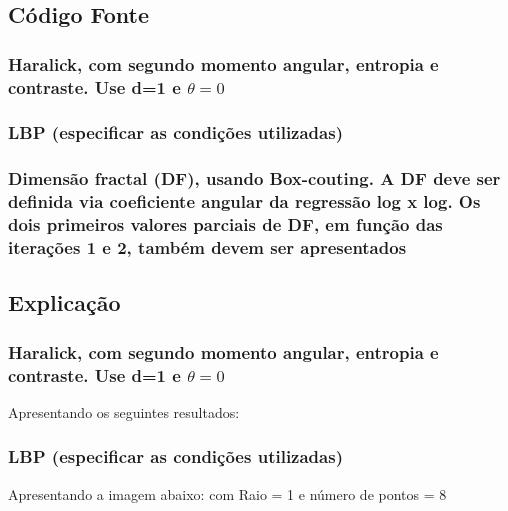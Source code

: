 \documentclass[10pt,a4paper]{article}
\begin{document}
\subsection{Código Fonte}

\subsubsection{Haralick, com segundo momento angular, entropia e contraste. Use d=1 e $\theta=0$}



\subsubsection{LBP (especificar as condições utilizadas)}



\subsubsection{Dimensão fractal (DF), usando Box-couting. A DF deve ser definida via coeficiente angular da regressão log x log. Os dois primeiros valores parciais de DF, em função das iterações 1 e 2, também devem ser apresentados}



\subsection{Explicação}

\subsubsection{Haralick, com segundo momento angular, entropia e contraste. Use d=1 e  $\theta=0$}

\begin{flushleft}
Apresentando os seguintes resultados:
\end{flushleft}



\subsubsection{LBP (especificar as condições utilizadas)}

\begin{flushleft}
Apresentando a imagem abaixo: com Raio = 1 e número de pontos = 8 
\end{flushleft}
\end{document}
